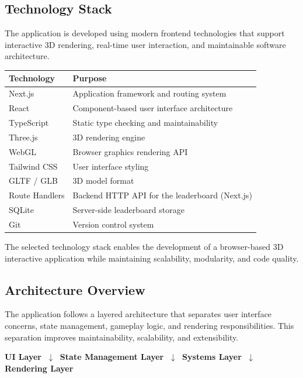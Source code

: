 \documentclass[11pt,a4paper]{article}
\begin{document}
\subsection{Technology Stack}

The application is developed using modern frontend technologies that support
interactive 3D rendering, real-time user interaction, and maintainable software
architecture.

\begin{center}
\begin{tabular}{ll}
  \toprule
  \textbf{Technology} & \textbf{Purpose} \\
  \midrule
  Next.js        & Application framework and routing system \\
  React          & Component-based user interface architecture \\
  TypeScript     & Static type checking and maintainability \\
  Three.js       & 3D rendering engine \\
  WebGL          & Browser graphics rendering API \\
  Tailwind CSS   & User interface styling \\
  GLTF / GLB     & 3D model format \\
  Route Handlers & Backend HTTP API for the leaderboard (Next.js) \\
  SQLite         & Server-side leaderboard storage \\
  Git            & Version control system \\
  \bottomrule
\end{tabular}
\end{center}

The selected technology stack enables the development of a browser-based 3D
interactive application while maintaining scalability, modularity, and code
quality.

\subsection{Architecture Overview}

The application follows a layered architecture that separates user interface
concerns, state management, gameplay logic, and rendering responsibilities. This
separation improves maintainability, scalability, and extensibility.

\begin{center}
\textbf{UI Layer} $\;\downarrow\;$
\textbf{State Management Layer} $\;\downarrow\;$
\textbf{Systems Layer} $\;\downarrow\;$
\textbf{Rendering Layer}
\end{center}
\end{document}
